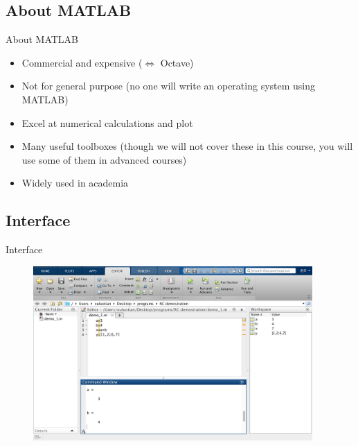 \subsection{About MATLAB}
\begin{frame}{About MATLAB}
\begin{itemize}
\item Commercial and expensive ($\Leftrightarrow$ Octave)
\item Not for general purpose (no one will write an operating system using MATLAB)
\item Excel at numerical calculations and plot
\item Many useful toolboxes (though we will not cover these in this course, you will use some of them in advanced courses)
\item Widely used in academia
\end{itemize}
\end{frame}

\subsection{Interface}
\begin{frame}{Interface}
\begin{figure}[htbp]
\centering
\includegraphics[width=0.95\textwidth]{pic/window.png}
\end{figure}
\end{frame}

